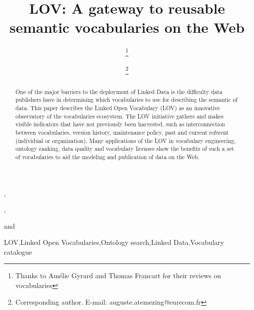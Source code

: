 \documentclass{iosart2c}
\begin{document}
\begin{frontmatter}                        %

%
\title{LOV: A gateway to reusable semantic vocabularies on the Web}




\author[A]{   \thanks{Thanks to Am\'elie Gyrard and Thomas Francart for their reviews on vocabularies}},
\author[B]{ \thanks{Corresponding author. E-mail: auguste.atemezing@eurecom.fr}},
\author[C]{ }
and
\author[D]{ }
\address[A]{Fujitsu (Ireland) Limited, Swords, Co. Dublin, Ireland\\
E-mail: pierre-yves.vandenbussche@ie.fujitsu.com}
\address[B]{Multimedia Communication Department, EURECOM, Campus SophiaTech
450, route des Chappes, 06410 Biot, France\\
E-mail: auguste.atemezing@eurecom.fr}
\address[C]{Ontology Engineering Group (OEG), 
Universidad Polit\'ecnica de Madrid, Madrid, Spain\\
E-mail: mpoveda@fi.upm.es}
\address[D]{Mondeca, 35 boulevard de Strasbourg, 75010 Paris, France
\\
E-mail: bernard.vatant@mondeca.com}


\begin{abstract}
One of the major barriers to the deployment of Linked Data is the difficulty data publishers have in determining which vocabularies to use for describing the semantic of data. This paper describes the Linked Open Vocabulary (LOV) as an innovative observatory of the vocabularies ecosystem. The LOV initiative gathers and makes visible indicators that have not previously been harvested, such as interconnection between vocabularies, version history, maintenance policy, past and current referent (individual or organization). Many applications of the LOV in vocabulary engineering, ontology ranking, data quality and vocabulary licenses show the benefits of such a set of vocabularies to aid the modeling and publication of data on the Web.
\end{abstract}

\begin{keyword}
LOV\sep Linked Open Vocabularies\sep Ontology search\sep Linked Data\sep Vocabulary catalogue
\end{keyword}

\end{frontmatter}
\end{document}
